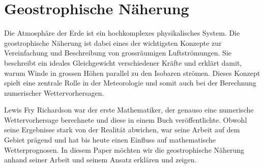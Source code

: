 %
%
%
%
\chapter{Geostrophische Näherung\label{chapter:geostrophisch}}
\begin{refsection}

Die Atmosphäre der Erde ist ein hochkomplexes physikalisches System.
Die geostrophische Näherung ist dabei eines der wichtigsten Konzepte zur Vereinfachung und Beschreibung von grossräumigen Luftströmungen.
Sie beschreibt ein ideales Gleichgewicht verschiedener Kräfte und erklärt damit, warum Winde in grossen Höhen parallel zu den Isobaren strömen. 
Dieses Konzept spielt eine zentrale Rolle in der Meteorologie und somit auch bei der Berechnung numerischer Wettervorhersagen.

Lewis Fry Richardson war der erste Mathematiker, der genauso eine numerische Wettervorhersage berechnete und diese in einem Buch veröffentlichte.
Obwohl seine Ergebnisse stark von der Realität abwichen, war seine Arbeit auf dem Gebiet prägend und hat bis heute einen Einfluss auf mathematische Wetterprognosen.
In diesem Paper möchten wir die geostrophische Näherung anhand seiner Arbeit und seinem Ansatz erklären und zeigen. 






\printbibliography[heading=subbibliography]
\end{refsection}

